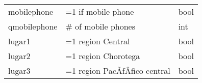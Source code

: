 \documentclass[11pt]{article}
\begin{document}
\begin{longtable}[]{@{}lll@{}}
\begin{minipage}[t]{0.19\columnwidth}\raggedright\strut
mobilephone\strut
\end{minipage} & \begin{minipage}[t]{0.16\columnwidth}\raggedright\strut
=1 if mobile phone\strut
\end{minipage} & \begin{minipage}[t]{0.24\columnwidth}\raggedright\strut
bool\strut
\end{minipage}\tabularnewline
\begin{minipage}[t]{0.19\columnwidth}\raggedright\strut
qmobilephone\strut
\end{minipage} & \begin{minipage}[t]{0.16\columnwidth}\raggedright\strut
\# of mobile phones\strut
\end{minipage} & \begin{minipage}[t]{0.24\columnwidth}\raggedright\strut
int\strut
\end{minipage}\tabularnewline
\begin{minipage}[t]{0.19\columnwidth}\raggedright\strut
lugar1\strut
\end{minipage} & \begin{minipage}[t]{0.16\columnwidth}\raggedright\strut
=1 region Central\strut
\end{minipage} & \begin{minipage}[t]{0.24\columnwidth}\raggedright\strut
bool\strut
\end{minipage}\tabularnewline
\begin{minipage}[t]{0.19\columnwidth}\raggedright\strut
lugar2\strut
\end{minipage} & \begin{minipage}[t]{0.16\columnwidth}\raggedright\strut
=1 region Chorotega\strut
\end{minipage} & \begin{minipage}[t]{0.24\columnwidth}\raggedright\strut
bool\strut
\end{minipage}\tabularnewline
\begin{minipage}[t]{0.19\columnwidth}\raggedright\strut
lugar3\strut
\end{minipage} & \begin{minipage}[t]{0.16\columnwidth}\raggedright\strut
=1 region PacÃƒÂ­fico central\strut
\end{minipage} & \begin{minipage}[t]{0.24\columnwidth}\raggedright\strut
bool\strut
\end{minipage}\tabularnewline

\end{longtable}
\end{document}
